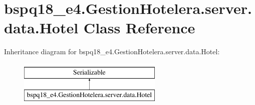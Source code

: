\hypertarget{classbspq18__e4_1_1_gestion_hotelera_1_1server_1_1data_1_1_hotel}{}\section{bspq18\+\_\+e4.\+Gestion\+Hotelera.\+server.\+data.\+Hotel Class Reference}
\label{classbspq18__e4_1_1_gestion_hotelera_1_1server_1_1data_1_1_hotel}
Inheritance diagram for bspq18\+\_\+e4.\+Gestion\+Hotelera.\+server.\+data.\+Hotel\+:\begin{figure}[H]
\begin{center}
\leavevmode
\includegraphics[height=2.000000cm]{classbspq18__e4_1_1_gestion_hotelera_1_1server_1_1data_1_1_hotel}
\end{center}
\end{figure}
